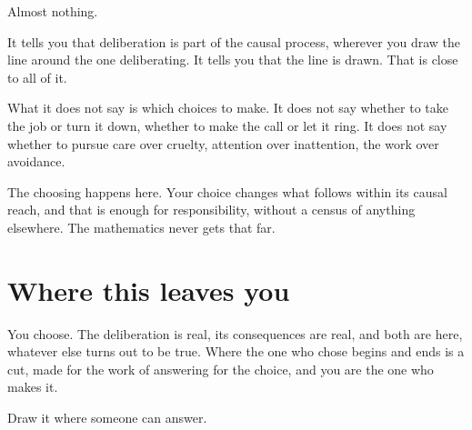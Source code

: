 Almost nothing.

It tells you that deliberation is part of the causal process, wherever you draw the line around the one deliberating. It tells you that the line is drawn. That is close to all of it.

What it does not say is which choices to make. It does not say whether to take the job or turn it down, whether to make the call or let it ring. It does not say whether to pursue care over cruelty, attention over inattention, the work over avoidance.

The choosing happens here. Your choice changes what follows within its causal reach, and that is enough for responsibility, without a census of anything elsewhere. The mathematics never gets that far.

\section*{Where this leaves you}

You choose. The deliberation is real, its consequences are real, and both are here, whatever else turns out to be true. Where the one who chose begins and ends is a cut, made for the work of answering for the choice, and you are the one who makes it.

Draw it where someone can answer.
